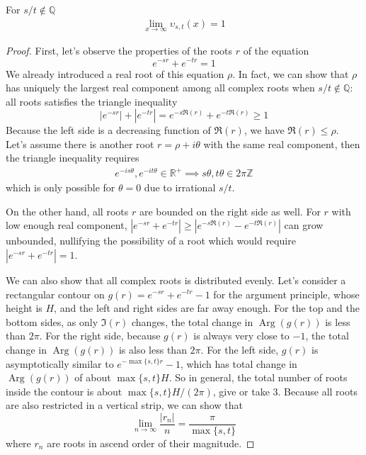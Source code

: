 \documentclass[]{article}
\DeclareMathOperator\Arg{Arg}
\begin{document}
\vspace{1cm}
\begin{lemma}
	For $s/t\notin\mathbb{Q}$
	\begin{align*}
	\lim_{x\to\infty} \upsilon_{s,t}(x) = 1 
	\end{align*}
\end{lemma}
\begin{proof}
First, let's observe the properties of the roots $r$ of the equation
\[
e^{-sr} + e^{-tr} = 1
\]
We already introduced a real root of this equation $\rho$. In fact, we can show that $\rho$ has uniquely the largest real component among all complex roots when $s/t\notin\mathbb{Q}$: all roots satisfies the triangle inequality
\[
|e^{-sr}| + |e^{-tr}| = e^{-s\Re(r)} + e^{-t\Re(r)} \ge 1
\]
Because the left side is a decreasing function of $\Re(r)$, we have $\Re(r) \le \rho$. Let's assume there is another root $r=\rho + i\theta$ with the same real component, then the triangle inequality requires
\begin{align*}
e^{-is\theta},e^{-it\theta}\in\mathbb{R^+}\implies  s\theta,t\theta\in2\pi\mathbb{Z}
\end{align*}
which is only possible for $\theta = 0$ due to irrational $s/t$.

On the other hand, all roots $r$ are bounded on the right side as well. For $r$ with low enough real component, $|e^{-sr} + e^{-tr}| \ge |e^{-s\Re(r)} - e^{-t\Re(r)}|$ can grow unbounded, nullifying the possibility of a root which would require  $|e^{-sr} + e^{-tr}|=1$.

We can also show that all complex roots is distributed evenly. Let's consider a rectangular contour on $g(r) = e^{-sr} + e^{-tr} - 1$ for the argument principle, whose height is $H$, and the left and right sides are far away enough. For the top and the bottom sides, as only $\Im(r)$ changes, the total change in $\Arg(g(r))$ is less than $2\pi$. For the right side, because $g(r)$ is always very close to $-1$, the total change in $\Arg(g(r))$ is also less than $2\pi$. For the left side, $g(r)$ is asymptotically similar to $e^{-\max\{s,t\}r}-1$, which has total change in $\Arg(g(r))$ of about $\max\{s,t\}H$. So in general, the total number of roots inside the contour is about $\max\{s,t\}H/(2\pi)$, give or take 3. Because all roots are also restricted in a vertical strip, we can show that
\[
\lim_{n\to\infty}\frac{|r_n|}{n} = \frac{\pi}{\max\{s,t\}}
\]
where $r_n$ are roots in ascend order of their magnitude.


\end{proof}
\end{document}
